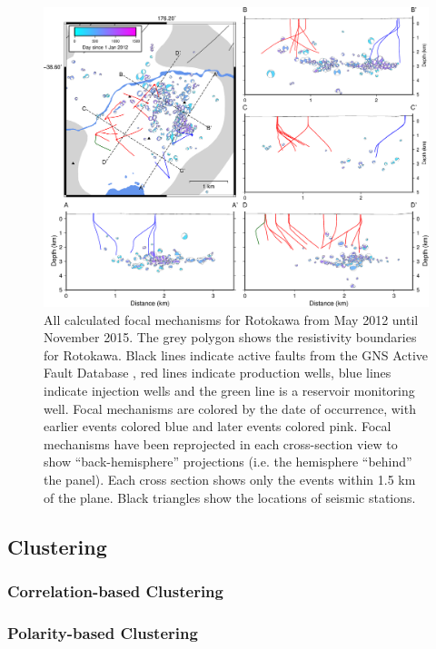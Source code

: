 \begin{figure}[h!]
\begin{center}
\includegraphics[width=1.00\columnwidth]{Chapter_5_FMs/figures/merc_Rot_GC_focmecs/merc_Rot_GC_focmecs_original}
\caption{{All calculated focal mechanisms for Rotokawa from May 2012 until
November 2015. The grey polygon shows the resistivity boundaries for
Rotokawa. Black lines indicate active faults from the GNS Active Fault
Database \citep{AFDB}, red lines indicate
production wells, blue lines indicate injection wells and the green line
is a reservoir monitoring well. Focal mechanisms are colored by the date
of occurrence, with earlier events colored blue and later events colored
pink. Focal mechanisms have been reprojected in each cross-section view
to show ``back-hemisphere'' projections (i.e. the hemisphere ``behind''
the panel). Each cross section shows only the events within 1.5 km of
the plane. Black triangles show the locations of seismic stations.
{\label{817909}}%
}}
\end{center}
\end{figure}

\subsection{Clustering}
\subsubsection{Correlation-based Clustering}
\subsubsection{Polarity-based Clustering}
